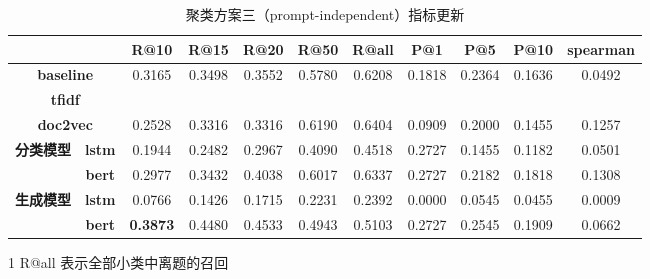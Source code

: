 \documentclass[11pt]{article}
\begin{document}
\begin{CJK}{UTF8}{gkai}
\begin{table}[htbp]
  \centering
    \begin{tabular}{c|c|c|c|c|c|c|c|c|c|c}
      \hline
      \multicolumn{2}{c|}{\textcolor[rgb]{ 1,  0,  0}{}} & \textbf{R@10} & \textbf{R@15} & \textbf{R@20} & \textbf{R@50} & \textbf{R@all} & \textbf{P@1} & \textbf{P@5} & \textbf{P@10} & \textbf{spearman} \\
      \hline
      \multicolumn{2}{c|}{\textbf{baseline}} & 0.3165  & 0.3498  & 0.3552  & 0.5780  & 0.6208  & 0.1818  & 0.2364  & 0.1636  & 0.0492  \\
      \hline
      \multicolumn{2}{c|}{\textbf{tfidf}} &       &       &       &       &       &       &       &       &  \\
      \hline
      \multicolumn{2}{c|}{\textbf{doc2vec}} & 0.2528  & 0.3316  & 0.3316  & 0.6190  & 0.6404  & 0.0909  & 0.2000  & 0.1455  & 0.1257  \\
      \hline
      \multirow{2}[0]{*}{\textbf{分类模型}} & \textbf{lstm} & 0.1944  & 0.2482  & 0.2967  & 0.4090  & 0.4518  & 0.2727  & 0.1455  & 0.1182  & 0.0501  \\
      & \textbf{bert} & 0.2977  & 0.3432  & 0.4038  & 0.6017  & 0.6337  & 0.2727  & 0.2182  & 0.1818  & 0.1308  \\
      \hline
      \multirow{2}[0]{*}{\textbf{生成模型}} & \textbf{lstm} & 0.0766  & 0.1426  & 0.1715  & 0.2231  & 0.2392  & 0.0000  & 0.0545  & 0.0455  & 0.0009  \\
      & \textbf{bert} & \textcolor[rgb]{ 1,  0,  0}{\textbf{0.3873 }} & 0.4480  & 0.4533  & 0.4943  & 0.5103  & 0.2727  & 0.2545  & 0.1909  & 0.0662  \\
      \hline
    \end{tabular}%
    \begin{tablenotes}    %
      \footnotesize               %
      \item[1] R@all 表示全部小类中离题的召回
    \end{tablenotes} 
    \caption{聚类方案三（prompt-independent）指标更新}
  \label{tab:addlabel}%
\end{table}%



\end{CJK}
\end{document}
